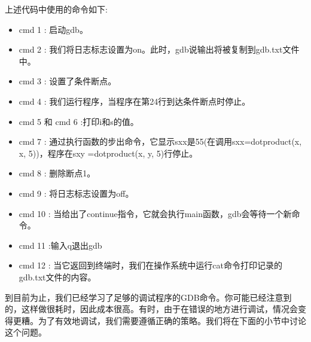 上述代码中使用的命令如下: \par

\begin{itemize}
	\item cmd 1 : 启动gdb。
	\item cmd 2 : 我们将日志标志设置为on。此时，gdb说输出将被复制到gdb.txt文件中。
	\item cmd 3 : 设置了条件断点。
	\item cmd 4 : 我们运行程序，当程序在第24行到达条件断点时停止。
	\item cmd 5 和 cmd 6 :打印i和s的值。
	\item cmd 7 : 通过执行函数的步出命令，它显示sxx是55(在调用sxx=dotproduct(x, x, 5))，程序在sxy =dotproduct(x, y, 5)行停止。
	\item cmd 8 : 删除断点1。
	\item cmd 9 : 将日志标志设置为off。
	\item cmd 10 : 当给出了continue指令，它就会执行main函数，gdb会等待一个新命令。
	\item cmd 11 :输入q退出gdb
	\item cmd 12 : 当它返回到终端时，我们在操作系统中运行cat命令打印记录的gdb.txt文件的内容。
\end{itemize}

到目前为止，我们已经学习了足够的调试程序的GDB命令。你可能已经注意到的，这样做很耗时，因此成本很高。有时，由于在错误的地方进行调试，情况会变得更糟。为了有效地调试，我们需要遵循正确的策略。我们将在下面的小节中讨论这个问题。 \par

